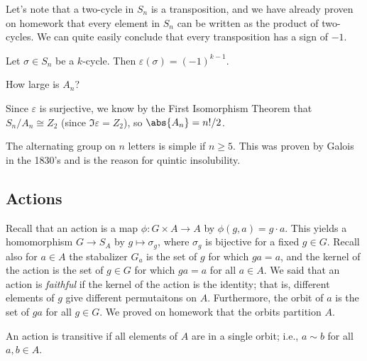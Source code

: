 Let's note that a two-cycle in $S_n$ is a transposition, and we have already proven on homework that every element in $S_n$ can be written as the product of two-cycles. We can quite easily conclude that every transposition has a sign of $-1$.

\begin{proposition}
Let $\sigma \in S_n$ be a $k$-cycle. Then $\varepsilon(\sigma) = (-1)^{k-1}$.
\end{proposition}

\begin{problem}
How large is $A_n$?
\end{problem}

Since $\varepsilon$ is surjective, we know by the First Isomorphism Theorem that $S_n / A_n \cong Z_2$ (since $\Im\varepsilon = Z_2$), so $\abs{A_n} = n!/2$.

\begin{theorem}
The alternating group on $n$ letters is simple if $n \geq 5$. This was proven by Galois in the 1830's and is the reason for quintic insolubility.
\end{theorem}

\subsection{Actions}

Recall that an action is a map $\phi : G \times A \to A$ by $\phi(g,a) = g \cdot a$. This yields a homomorphism $G \to S_A$ by $g \mapsto \sigma_g$, where $\sigma_g$ is bijective for a fixed $g \in G$. Recall also for $a \in A$ the stabalizer $G_a$ is the set of $g$ for which $ga = a$, and the kernel of the action is the set of $g \in G$ for which $ga = a$ for all $a \in A$. We said that an action is \emph{faithful} if the kernel of the action is the identity; that is, different elements of $g$ give different permutaitons on $A$. Furthermore, the orbit of $a$ is the set of $ga$ for all $g \in G$. We proved on homework that the orbits partition $A$.

\begin{definition}[Transitive]
An action is transitive if all elements of $A$ are in a single orbit; i.e., $a \sim b$ for all $a,b \in A$.
\end{definition}